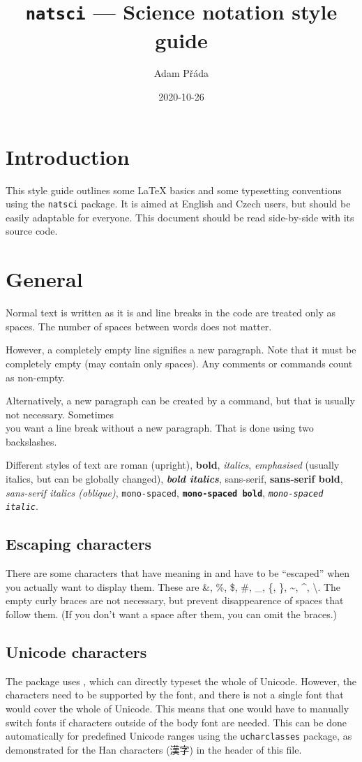 \documentclass{article}
\title{\vspace{-2cm}\texttt{natsci} --- Science notation style guide}
\author{Adam Přáda}
\date{2020-10-26}
\begin{document}
\pagestyle{fancy}
\maketitle
\section{Introduction}
This style guide outlines some \LaTeX{} basics and some typesetting conventions using the \texttt{natsci} package. It is aimed at English and Czech users, but should be easily adaptable for everyone. This document should be read side-by-side with its source code.
\section{General}
Normal text is written as it is
and line breaks
in
the
code
are treated only as spaces. The number of spaces                            between words does not matter.

However, a completely empty line signifies a new paragraph. Note that it must be completely empty (may contain only spaces). Any comments or commands count as non-empty. \par Alternatively, a new paragraph can be created by a command, but that is usually not necessary. Sometimes\\ you want a line break without a new paragraph. That is done using two backslashes.

Different styles of text are \textrm{roman (upright)}, \textbf{bold}, \textit{italics}, \emph{emphasised} (usually italics, but can be globally changed), \textbf{\textit{bold italics}}, \textsf{sans-serif}, \textsf{\textbf{sans-serif bold}}, \textsf{\textit{sans-serif italics (oblique)}}, \texttt{mono-spaced}, \texttt{\textbf{mono-spaced bold}}, \texttt{\textit{mono-spaced italic}}.

\subsection{Escaping characters}
There are some characters that have meaning in  and have to be ``escaped'' when you actually want to display them. These are \&, \%, \$, \#, \_, \{, \}, \textasciitilde{}, \textasciicircum{}, \textbackslash{}. The empty curly braces are not necessary, but prevent disappearence of spaces that follow them. (If you don't want a space after them, you can omit the braces.)

\subsection{Unicode characters}
The package uses , which can directly typeset the whole of Unicode. However, the characters need to be supported by the font, and there is not a single font that would cover the whole of Unicode. This means that one would have to manually switch fonts if characters outside of the body font are needed. This can be done automatically for predefined Unicode ranges using the \texttt{ucharclasses} package, as demonstrated for the Han characters (漢字) in the header of this file.
\newpage
\end{document}
